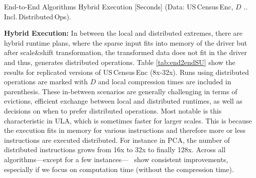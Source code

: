 \newcommand{\subhead}{
	& \textbf{ULA}  & \textbf{\name} & \textbf{ULA} & \textbf{\name} & \textbf{ULA} & \textbf{\name} \\
}

\newcommand{\dist}{{\tiny$^D$}}


\begin{table} [!t] \setlength\tabcolsep{11.2pt}
	\caption{\label{tab:end2endSU}End-to-End Algorithms Hybrid Execution [Seconds] (Data: US\,Census\,Enc, $D$ .. Incl.\,Distributed\,Ops).}
	\vspace{-0.4cm}

	

\end{table}


\textbf{Hybrid Execution:} In between the local and distributed extremes, there are hybrid runtime plans, where the sparse input fits into memory
of the driver but after scale\&shift transformation, the transformed data does not fit in the driver and thus, generates distributed operations.
Table \ref{tab:end2endSU} show the results for replicated versions of US\,Census\,Enc (8x-32x).
Runs using distributed operations are marked with $D$ and local compression times are included in parenthesis.
These in-between scenarios are generally challenging in terms of evictions,
efficient exchange between local and distributed runtimes, as well as decisions on when to prefer distributed operations.
Most notable is this characteristic in ULA, which is sometimes faster for larger scales.
This is because the execution fits in memory for various instructions and therefore more or less instructions are executed distributed.
For instance in PCA, the number of distributed instructions grows from 16x to 32x to finally 128x.
Across all algorithms---except for a few instances---\name~ show consistent improvements, especially if we focus on computation time (without the compression time).

